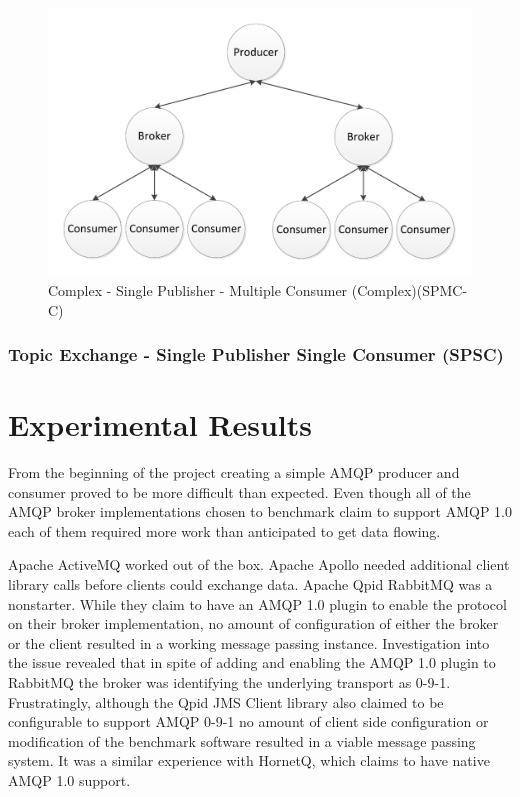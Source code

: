 \documentclass{thesis}
\begin{document}
\begin{figure}
\centering
\vspace{2.0in} 
\includegraphics{complicated_fanout}  
\caption{Complex - Single Publisher - Multiple Consumer (Complex)(SPMC-C)}
\label{Figure 4}  
\end{figure}


\subsection{Topic Exchange - Single Publisher Single Consumer (SPSC)}


\chapter{Experimental Results}

From the beginning of the project creating a simple AMQP producer and consumer proved to be more difficult than expected.  Even though all of the AMQP broker implementations chosen to benchmark claim to support AMQP 1.0 each of them required more work than anticipated to get data flowing.  

Apache ActiveMQ worked out of the box.  
Apache Apollo needed additional client library calls before clients could exchange data.
Apache Qpid 
RabbitMQ was a nonstarter.  While they claim to have an AMQP 1.0 plugin to enable the protocol on their broker implementation, no amount of configuration of either the broker or the client resulted in a working message passing instance.  Investigation into the issue revealed that in spite of adding and enabling the AMQP 1.0 plugin to RabbitMQ the broker was identifying the underlying transport as 0-9-1.  Frustratingly, although the Qpid JMS Client library also claimed to be configurable to support AMQP 0-9-1 no amount of client side configuration or modification of the benchmark software resulted in a viable message passing system.
It was a similar experience with HornetQ, which claims to have native AMQP 1.0 support. 
\end{document}
